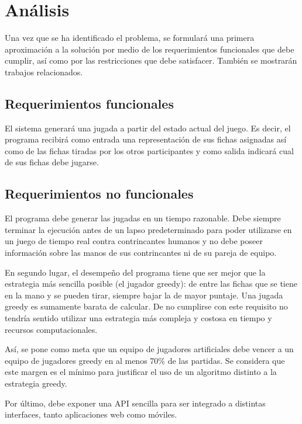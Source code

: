 \chapter{Análisis}

\noindent
Una vez que se ha identificado el problema, se formulará una primera
aproximación a la solución por medio de los requerimientos funcionales que debe
cumplir, así como por las restricciones que debe satisfacer. También se
mostrarán trabajos relacionados.

\newpage

\section{Requerimientos funcionales}

El sistema generará una jugada a partir del estado actual del juego. Es decir,
el programa recibirá como entrada una representación de sus fichas asignadas así
como de las fichas tiradas por los otros participantes y como salida indicará
cual de sus fichas debe jugarse.

\section{Requerimientos no funcionales}

El programa debe generar las jugadas en un tiempo razonable. Debe siempre
terminar la ejecución antes de un lapso predeterminado para poder utilizarse en
un juego de tiempo real contra contrincantes humanos y no debe poseer
información sobre las manos de sus contrincantes ni de su pareja de equipo.

En segundo lugar, el desempeño del programa tiene que ser mejor que la
estrategia más sencilla posible (el jugador greedy): de entre las fichas que se
tiene en la mano y se pueden tirar, siempre bajar la de mayor puntaje. Una
jugada greedy es sumamente barata de calcular. De no cumplirse con este
requisito no tendría sentido utilizar una estrategia más compleja y costosa en
tiempo y recursos computacionales.

Así, se pone como meta que un equipo de jugadores artificiales debe vencer a un
equipo de jugadores greedy en al menos 70\% de las partidas. Se considera que
este margen es el mínimo para justificar el uso de un algoritmo distinto a la
estrategia greedy.

Por último, debe exponer una API sencilla para ser integrado a distintas
interfaces, tanto aplicaciones web como móviles.

